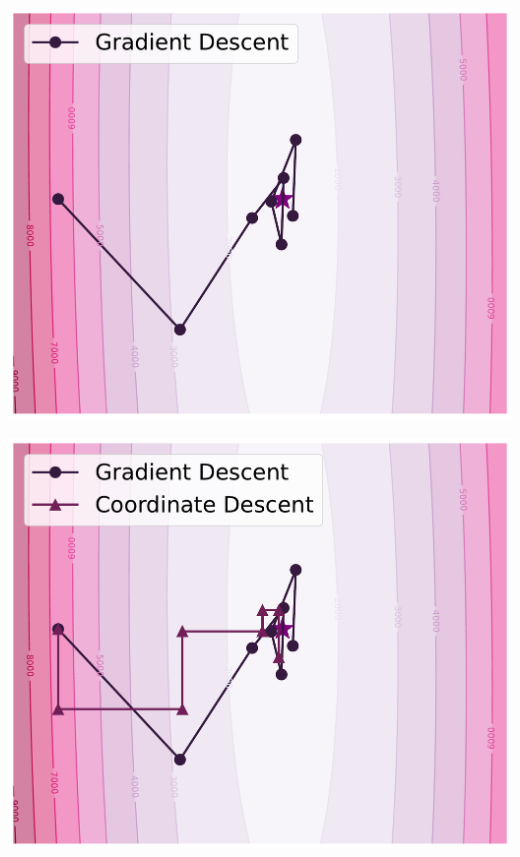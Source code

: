 \documentclass{beamer}
\begin{document}
\hspace{-3.3em}
\begin{frame}
  \vspace{-0.3em}
  \includegraphics[width=1.17\textwidth]{example_1.pdf}
\end{frame}


\hspace{-3.3em}
\begin{frame}
  \vspace{-0.3em}
  \includegraphics[width=1.17\textwidth]{example_2.pdf}

  \addtocounter{framenumber}{-1}
\end{frame}
\end{document}
